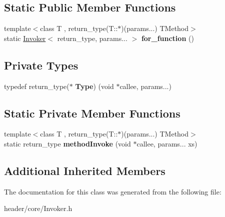 \subsection*{Static Public Member Functions}
\begin{DoxyCompactItemize}
\item 
\mbox{\label{classcore_1_1_invoker_a3bd0db4d50a571274962ef1d52f00470}} 
{\footnotesize template$<$class T , return\+\_\+type(\+T\+::$\ast$)(params...) T\+Method$>$ }\\static \hyperlink{classcore_1_1_invoker}{Invoker}$<$ return\+\_\+type, params... $>$ {\bfseries for\+\_\+function} ()
\end{DoxyCompactItemize}
\subsection*{Private Types}
\begin{DoxyCompactItemize}
\item 
\mbox{\label{classcore_1_1_invoker_afa39d69cc0b13c031e7bc852fcf6c823}} 
typedef return\+\_\+type($\ast$ {\bfseries Type}) (void $\ast$callee, params...)
\end{DoxyCompactItemize}
\subsection*{Static Private Member Functions}
\begin{DoxyCompactItemize}
\item 
\mbox{\label{classcore_1_1_invoker_ac3a4c67c5938fe9d38b28bbfe4451ef5}} 
{\footnotesize template$<$class T , return\+\_\+type(\+T\+::$\ast$)(params...) T\+Method$>$ }\\static return\+\_\+type {\bfseries method\+Invoke} (void $\ast$callee, params... xs)
\end{DoxyCompactItemize}
\subsection*{Additional Inherited Members}


The documentation for this class was generated from the following file\+:\begin{DoxyCompactItemize}
\item 
header/core/Invoker.\+h\end{DoxyCompactItemize}

